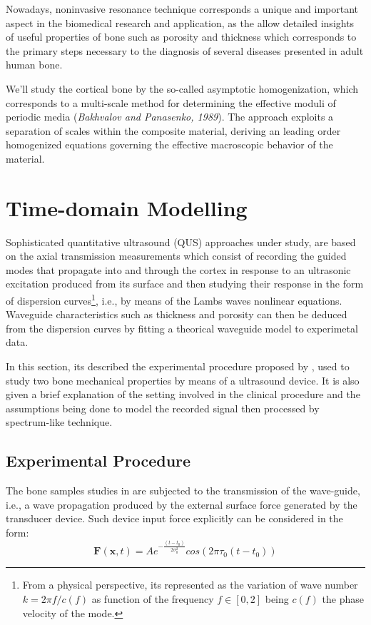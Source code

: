 Nowadays, noninvasive resonance technique corresponds a unique and important aspect in the biomedical research and application, as the allow detailed insights of useful properties of bone such as porosity and thickness which corresponds to the primary steps necessary to the diagnosis of several diseases presented in adult human bone.

We'll study the cortical bone by the so-called asymptotic homogenization, which corresponds to a multi-scale method for determining the effective moduli of periodic media (\textit{Bakhvalov and Panasenko, 1989}). The approach exploits a separation of scales within the composite material, deriving an leading order homogenized equations governing the effective macroscopic behavior of the material.\\


\section{Time-domain Modelling}

Sophisticated quantitative ultrasound (QUS) approaches under study, are based on the axial transmission measurements which consist of recording the guided modes that propagate into and through the cortex in response to an ultrasonic excitation produced from its surface and then studying their response in the form of dispersion curves\footnote{From a physical perspective, its represented as the variation of wave number $k = 2 \pi f/c(f)$ as function of the frequency $f \in [0, 2]$ being $c(f)$ the phase velocity of the mode.}, i.e., by means of the Lambs waves nonlinear equations. 
Waveguide characteristics such as thickness and porosity can then be deduced from the dispersion curves by fitting a theorical waveguide model to experimetal data.

In this section, its described the experimental procedure proposed by \cite{Foiret2014}, \cite{Minonzio2018} used to study two bone mechanical properties by means of a ultrasound device. 
It is also given a brief explanation of the setting involved in the clinical procedure and the assumptions being done to model the recorded signal then processed by spectrum-like technique. 

\subsection{Experimental Procedure}
The bone samples studies in \cite{Foiret2014} \cite{Minonzio2018} are subjected to the transmission of the wave-guide, i.e., a wave propagation produced by the external surface force generated by the transducer device. 
Such device input force explicitly can be considered in the form:
\begin{equation*}
    \mathbf{F}(\mathbf{x},t) = A e^{-\frac{(t-t_0)}{2\sigma_0^2}} cos(2 \pi \tau_0 (t-t_0))
\end{equation*}

